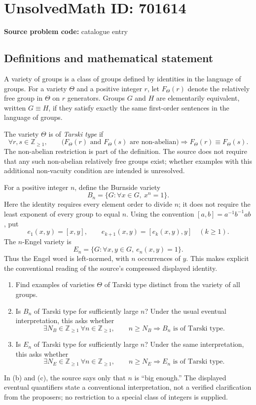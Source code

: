 \documentclass[11pt]{article}
\newcommand{\Z}{\mathbb{Z}}
\begin{document}
\section*{UnsolvedMath ID: 701614}
\textbf{Source problem code:} catalogue entry
\subsection{Definitions and mathematical statement}
A variety of groups is a class of groups defined by identities in the language of groups. For a variety \(\Theta\) and a positive integer \(r\), let \(F_\Theta(r)\) denote the relatively free group in \(\Theta\) on \(r\) generators. Groups \(G\) and \(H\) are elementarily equivalent, written \(G\equiv H\), if they satisfy exactly the same first-order sentences in the language of groups.

The variety \(\Theta\) is of \emph{Tarski type} if
\[
\forall r,s\in\Z_{\geq 1},\qquad
\bigl(F_\Theta(r)\text{ and }F_\Theta(s)\text{ are non-abelian}\bigr)
\Longrightarrow F_\Theta(r)\equiv F_\Theta(s).
\]
The non-abelian restriction is part of the definition. The source does not require that any such non-abelian relatively free groups exist; whether examples with this additional non-vacuity condition are intended is unresolved.

For a positive integer \(n\), define the Burnside variety
\[
B_n=\{G: \forall x\in G,\ x^n=1\}.
\]
Here the identity requires every element order to divide \(n\); it does not require the least exponent of every group to equal \(n\). Using the convention \([a,b]=a^{-1}b^{-1}ab\), put
\[
e_1(x,y)=[x,y],\qquad e_{k+1}(x,y)=[e_k(x,y),y]\quad(k\geq 1).
\]
The \(n\)-Engel variety is
\[
E_n=\{G: \forall x,y\in G,\ e_n(x,y)=1\}.
\]
Thus the Engel word is left-normed, with \(n\) occurrences of \(y\). This makes explicit the conventional reading of the source's compressed displayed identity.

\begin{enumerate}
\item[(a)] Find examples of varieties \(\Theta\) of Tarski type distinct from the variety of all groups.
\item[(b)] Is \(B_n\) of Tarski type for sufficiently large \(n\)? Under the usual eventual interpretation, this asks whether
\[
\exists N_B\in\Z_{\geq 1}\ \forall n\in\Z_{\geq 1},\qquad
n\geq N_B\Longrightarrow B_n\text{ is of Tarski type}.
\]
\item[(c)] Is \(E_n\) of Tarski type for sufficiently large \(n\)? Under the same interpretation, this asks whether
\[
\exists N_E\in\Z_{\geq 1}\ \forall n\in\Z_{\geq 1},\qquad
n\geq N_E\Longrightarrow E_n\text{ is of Tarski type}.
\]
\end{enumerate}
In (b) and (c), the source says only that \(n\) is ``big enough.'' The displayed eventual quantifiers state a conventional interpretation, not a verified clarification from the proposers; no restriction to a special class of integers is supplied.
\end{document}
